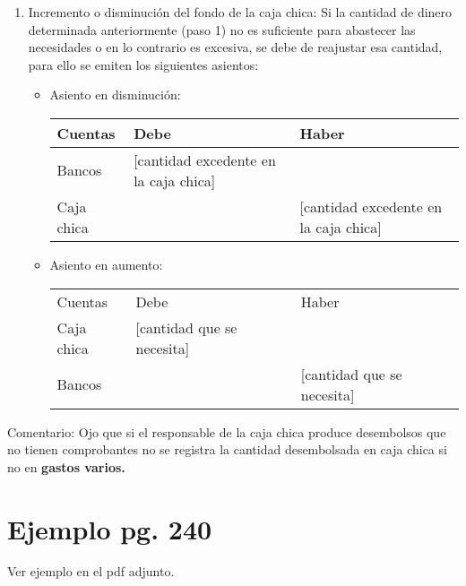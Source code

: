 \documentclass{article}
\begin{document}
\begin{enumerate}
    \item Incremento o disminución del fondo de la caja chica:  Si la cantidad de dinero determinada anteriormente (paso 1) no es suficiente para abastecer las necesidades o en lo contrario es excesiva, se debe de reajustar esa cantidad, para ello se emiten los siguientes asientos:
    \begin{itemize}
        \item Asiento en disminución:
        \begin{center}
        \begin{tabular}{ | p{9cm} | p{3cm} | p{3cm} | }
         \hline
        Cuentas & Debe & Haber \\
        \hline
        Bancos & [cantidad excedente en la caja chica] &  \\ 
        Caja chica & & [cantidad excedente en la caja chica] \\ 
         \hline
        \end{tabular}
        \end{center}

        
        \item Asiento en aumento:
        \begin{center}
        \begin{tabular}{ | p{9cm} | p{3cm} | p{3cm} | }
         \hline
         Cuentas & Debe & Haber \\
         Caja chica & [cantidad que se necesita] & \\ 
         Bancos & & [cantidad que se necesita] \\ 
         \hline
        \end{tabular}
        \end{center}
    \end{itemize}
\end{enumerate}

Comentario: Ojo que si el responsable de la caja chica produce desembolsos que no tienen comprobantes no se registra la cantidad desembolsada en caja chica si no en \textbf{gastos varios.}


\section{Ejemplo pg. 240}
Ver ejemplo en el pdf adjunto.
\end{document}
